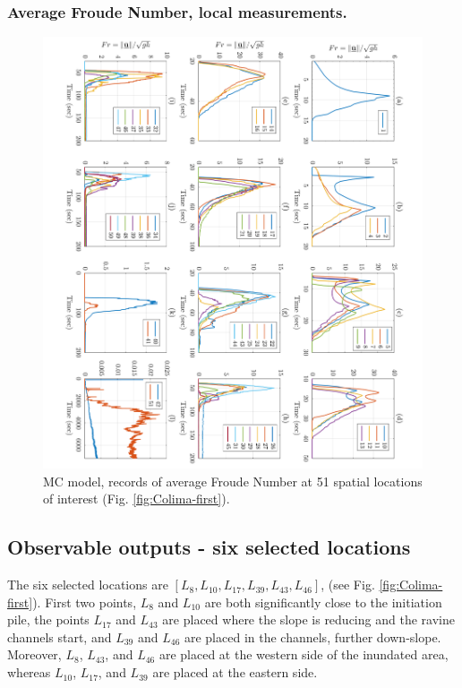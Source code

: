 \documentclass{article}
\begin{document}
\subsubsection{Average Froude Number, local measurements.}
\begin{figure}[H]
         \centering
        \includegraphics[width=1\textwidth]{MC&VS_51/Froude_MC.png}
        \caption{MC model, records of average Froude Number at 51 spatial locations of interest (Fig. \ref{fig:Colima-first}).}
        \label{fig:BAF-Fr-MC}
\end{figure}

\subsection{Observable outputs - six selected locations}\label{Obs2}
The six selected locations are $[L_8, L_{10}, L_{17}, L_{39}, L_{43}, L_{46}]$, (see Fig. \ref{fig:Colima-first}). First two points, $L_8$ and $L_{10}$ are both significantly close to the initiation pile, the points $L_{17}$ and $L_{43}$ are placed where the slope is reducing and the ravine channels start, and $L_{39}$ and $L_{46}$ are placed in the channels, further down-slope. Moreover, $L_8$, $L_{43}$, and $L_{46}$ are placed at the western side of the inundated area, whereas $L_{10}$, $L_{17}$, and $L_{39}$ are placed at the eastern side.
\end{document}

